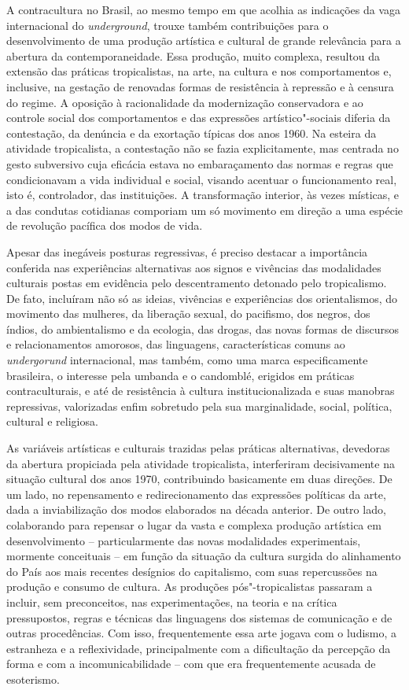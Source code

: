 A contracultura no Brasil, ao mesmo tempo em que acolhia as indicações
da vaga internacional do \emph{underground}, trouxe também contribuições
para o desenvolvimento de uma produção artística e cultural de grande
relevância para a abertura da contemporaneidade. Essa produção, muito
complexa, resultou da extensão das práticas tropicalistas, na arte, na
cultura e nos comportamentos e, inclusive, na gestação de renovadas
formas de resistência à repressão e à censura do regime. A oposição à
racionalidade da modernização conservadora e ao controle social dos
comportamentos e das expressões artístico"-sociais diferia da
contestação, da denúncia e da exortação típicas dos anos 1960. Na
esteira da atividade tropicalista, a contestação não se fazia
explicitamente, mas centrada no gesto subversivo cuja eficácia estava no
embaraçamento das normas e regras que condicionavam a vida individual e
social, visando acentuar o funcionamento real, isto é, controlador, das
instituições. A transformação interior, às vezes místicas, e a das
condutas cotidianas comporiam um só movimento em direção a uma espécie
de revolução pacífica dos modos de vida.

Apesar das inegáveis posturas regressivas, é preciso destacar a
importância conferida nas experiências alternativas aos signos e
vivências das modalidades culturais postas em evidência pelo
descentramento detonado pelo tropicalismo. De fato, incluíram não só as
ideias, vivências e experiências dos orientalismos, do movimento das
mulheres, da liberação sexual, do pacifismo, dos negros, dos índios, do
ambientalismo e da ecologia, das drogas, das novas formas de discursos e
relacionamentos amorosos, das linguagens, características comuns ao
\emph{undergorund} internacional, mas também, como uma marca
especificamente brasileira, o interesse pela umbanda e o candomblé,
erigidos em práticas contraculturais, e até de resistência à cultura
institucionalizada e suas manobras repressivas, valorizadas enfim
sobretudo pela sua marginalidade, social, política, cultural e
religiosa.

As variáveis artísticas e culturais trazidas pelas práticas
alternativas, devedoras da abertura propiciada pela atividade
tropicalista, interferiram decisivamente na situação cultural dos anos
1970, contribuindo basicamente em duas direções. De um lado, no
repensamento e redirecionamento das expressões políticas da arte, dada a
inviabilização dos modos elaborados na década anterior. De outro lado,
colaborando para repensar o lugar da vasta e complexa produção artística
em desenvolvimento -- particularmente das novas modalidades
experimentais, mormente conceituais -- em função da situação da cultura
surgida do alinhamento do País aos mais recentes desígnios do
capitalismo, com suas repercussões na produção e consumo de cultura. As
produções pós"-tropicalistas passaram a incluir, sem preconceitos, nas
experimentações, na teoria e na crítica pressupostos, regras e técnicas
das linguagens dos sistemas de comunicação e de outras procedências. Com
isso, frequentemente essa arte jogava com o ludismo, a estranheza e a
reflexividade, principalmente com a dificultação da percepção da forma e
com a incomunicabilidade -- com que era frequentemente acusada de
esoterismo.

